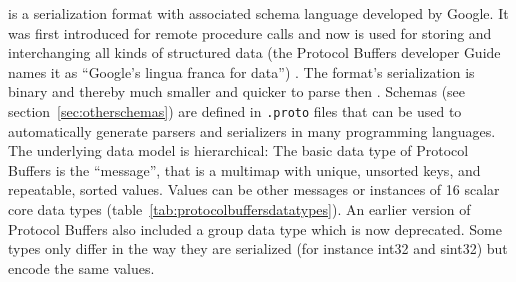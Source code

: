 

\label{ex:proto}

 is a serialization format with associated schema language
developed by Google. It was first introduced for remote procedure
calls and now is used for storing and interchanging all kinds of structured
data (the Protocol Buffers developer Guide names it as ``Google's lingua franca
for data'') \cite{Varda2008}. The format's serialization is binary and thereby
much smaller and quicker to parse then .  Schemas (see
section~\ref{sec:otherschemas}) are defined in \verb|.proto| files that can be
used to automatically generate parsers and serializers in many programming
languages. The underlying data model is hierarchical: The basic data type of
Protocol Buffers is the ``message'', that is a multimap with unique, unsorted
keys, and repeatable, sorted values. Values can be other messages or instances
of 16 scalar core data types (table~\ref{tab:protocolbuffersdatatypes}). An
earlier version of Protocol Buffers also included a group data type which is
now deprecated. Some types only differ in the way they are serialized (for
instance int32 and sint32) but encode the same values.

